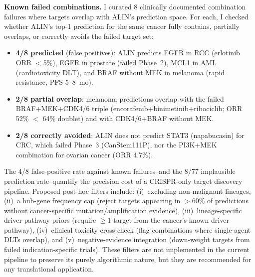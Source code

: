 \documentclass[11pt]{article}
\begin{document}
\textbf{Known failed combinations.} I curated 8 clinically documented combination failures where targets overlap with ALIN's prediction space. For each, I checked whether ALIN's top-1 prediction for the same cancer fully contains, partially overlaps, or correctly avoids the failed target set:

\begin{itemize}\setlength{\itemsep}{0pt}
\item \textbf{4/8 predicted} (false positives): ALIN predicts EGFR in RCC (erlotinib ORR $<$5\%), EGFR in prostate (failed Phase~2), MCL1 in AML (cardiotoxicity DLT), and BRAF without MEK in melanoma (rapid resistance, PFS 5--8~mo).
\item \textbf{2/8 partial overlap}: melanoma predictions overlap with the failed BRAF+MEK+CDK4/6 triple (encorafenib+binimetinib+ribociclib; ORR 52\% $<$ 64\% doublet) and with CDK4/6+BRAF without MEK.
\item \textbf{2/8 correctly avoided}: ALIN does not predict STAT3 (napabucasin) for CRC, which failed Phase~3 (CanStem111P), nor the PI3K+MEK combination for ovarian cancer (ORR 4.7\%).
\end{itemize}

\noindent The 4/8 false-positive rate against known failures--and the 8/77 implausible prediction rate--quantify the precision cost of a CRISPR-only target discovery pipeline. Proposed post-hoc filters include: (i)~excluding non-malignant lineages, (ii)~a hub-gene frequency cap (reject targets appearing in $>$60\% of predictions without cancer-specific mutation/amplification evidence), (iii)~lineage-specific driver-pathway priors (require $\geq$1 target from the cancer's known driver pathway), (iv)~clinical toxicity cross-check (flag combinations where single-agent DLTs overlap), and (v)~negative-evidence integration (down-weight targets from failed indication-specific trials). These filters are not implemented in the current pipeline to preserve its purely algorithmic nature, but they are recommended for any translational application.
\end{document}
